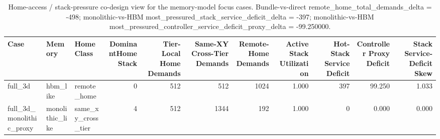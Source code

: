 \begin{table}[t]
  \centering
  \caption{Home-access / stack-pressure co-design view for the memory-model focus cases. Bundle-vs-direct remote\_home\_total\_demands\_delta = -498; monolithic-vs-HBM most\_pressured\_stack\_service\_deficit\_delta = -397; monolithic-vs-HBM most\_pressured\_controller\_service\_deficit\_proxy\_delta = -99.250000.}
  \begin{tabular}{l l l r r r r r r r r}
  \hline
  Case & Memory & HomeClass & DominantHomeStack & Tier-Local Home Demands & Same-XY Cross-Tier Demands & Remote-Home Demands & Active Stack Utilization & Hot-Stack Service Deficit & Controller Proxy Deficit & Stack Service-Deficit Skew \\
  \hline
  full\_3d & hbm\_like & remote\_home & 0 & 512 & 512 & 1024 & 1.000 & 397 & 99.250 & 1.033 \\
  full\_3d\_monolithic\_proxy & monolithic\_like & same\_xy\_cross\_tier & 4 & 512 & 1344 & 192 & 1.000 & 0 & 0.000 & 0.000 \\
  \hline
  \end{tabular}
\end{table}
